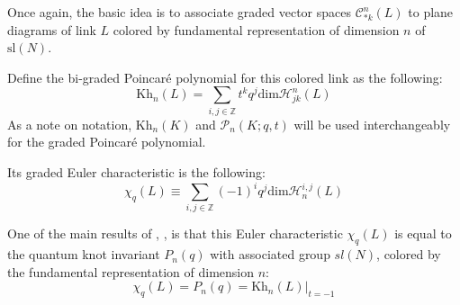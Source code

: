 \documentclass[a4paper,titlepage,twoside]{book}
\begin{document}
Once again, the basic idea is to associate graded vector spaces $\mathcal{C}_{*k}^n{(L)}$ to plane diagrams of link $L$ colored by fundamental representation of dimension $n$ of $\text{sl}{ (N)}$. %

Define the bi-graded Poincar\'{e} polynomial for this colored link as the following:
\begin{equation}
  \text{Kh}_n{(L)} = \sum_{ i, j \in \mathbb{Z}} t^k q^j \text{dim}{ \mathcal{H}_{jk}^n{ (L) } }
\end{equation}
As a note on notation, $\text{Kh}_n{(K)}$ and $\mathcal{P}_n{(K;q,t)}$ will be used interchangeably for the graded Poincar\'{e} polynomial.

Its graded Euler characteristic is the following:
\begin{equation}
\chi_q{(L)} \equiv \sum_{i,j \in \mathbb{Z}} (-1)^i q^j \text{dim}{ \mathcal{H}_n^{i,j}{ (L)} }
\end{equation}

One of the main results of \cite{KhovanovRozansky2004}, \cite{Khovanov2003}, is that this Euler characteristic $\chi_q{(L)}$ is equal to the quantum knot invariant $P_n{(q)}$ with associated group $sl{(N)}$, colored by the fundamental representation of dimension $n$:
\begin{equation}
  \chi_q{(L)} = P_n{ (q)} = \left. \text{Kh}_n{(L)} \right|_{t=-1}
\end{equation}


\end{document}
